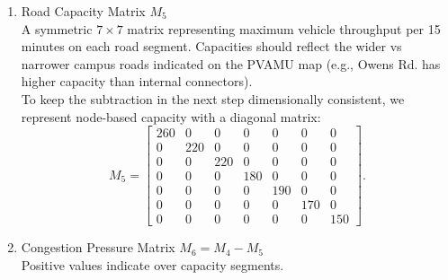 \documentclass{ximera}
\begin{document}
\begin{enumerate}
    Computing each entry,
    \[
    M_4=
    \begin{bmatrix}
    0(280)+0.35(140)+0.25(160)+0(220)+0.40(130)+0(210)+0(170)\\
    0.45(280)+0(140)+0(160)+0.55(220)+0(130)+0(210)+0(170)\\
    0.40(280)+0(140)+0(160)+0.60(220)+0(130)+0(210)+0(170)\\
    0(280)+0.20(140)+0.20(160)+0(220)+0(130)+0.60(210)+0(170)\\
    0.35(280)+0(140)+0(160)+0(220)+0(130)+0.40(210)+0.25(170)\\
    0(280)+0(140)+0(160)+0.50(220)+0.30(130)+0(210)+0.20(170)\\
    0(280)+0(140)+0(160)+0(220)+0.55(130)+0.45(210)+0(170)
    \end{bmatrix}
    \]
    \[
    =
    \begin{bmatrix}
    141\\
    247\\
    244\\
    186\\
    224.5\\
    183\\
    166
    \end{bmatrix}.
    \]

    \item Road Capacity Matrix $M_5$\\
    A symmetric $7\times 7$ matrix representing maximum vehicle throughput per 15 minutes on each road segment.
    Capacities should reflect the wider vs narrower campus roads indicated on the PVAMU map
    (e.g., Owens Rd. has higher capacity than internal connectors). \\

    To keep the subtraction in the next step dimensionally consistent, we represent node-based capacity with a diagonal matrix:
    \[
    M_5=
    \begin{bmatrix}
    260&0&0&0&0&0&0\\
    0&220&0&0&0&0&0\\
    0&0&220&0&0&0&0\\
    0&0&0&180&0&0&0\\
    0&0&0&0&190&0&0\\
    0&0&0&0&0&170&0\\
    0&0&0&0&0&0&150
    \end{bmatrix}.
    \]

    \item Congestion Pressure Matrix $M_6=M_4-M_5$\\
    Positive values indicate over capacity segments.\\


\end{enumerate}
\end{document}
